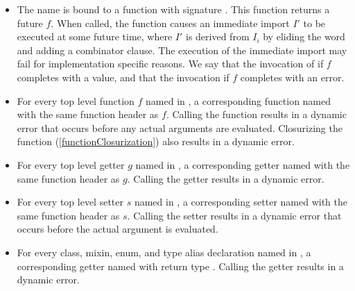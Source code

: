 \documentclass[makeidx]{article}
\begin{document}
{\begin{itemize}
\item The name  is bound to
  a function with signature .
  This function returns a future $f$.
  When called, the function causes
  an immediate import $I'$ to be executed at some future time,
  where $I'$ is derived from $I_i$ by eliding the word \DEFERRED{}
  and adding a \HIDE{}  combinator clause.
  The execution of the immediate import may fail
  for implementation specific reasons.
  We say that the invocation of 
   if $f$ completes with a value,
  and that the invocation
   if $f$ completes with an error.
\item
  For every top level function $f$ named \id{} in
  ,
  a corresponding function named \id{} with the same function header as $f$.
  Calling the function results in a dynamic error that occurs before
  any actual arguments are evaluated.
  Closurizing the function
  (\ref{functionClosurization})
  also results in a dynamic error.
\item
  For every top level getter $g$ named \id{} in
  ,
  a corresponding getter named \id{} with the same function header as $g$.
  Calling the getter results in a dynamic error.
\item
  For every top level setter $s$ named \code{\id=} in
  ,
  a corresponding setter named \code{\id=} with
  the same function header as $s$.
  Calling the setter results in a dynamic error that occurs before
  the actual argument is evaluated.
\item
  For every class, mixin, enum, and type alias declaration named \id{} in
  ,
  a corresponding getter named \id{} with return type .
  Calling the getter results in a dynamic error.
\end{itemize}

}
\end{document}

